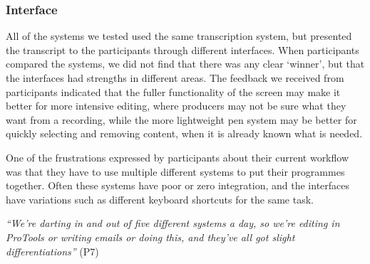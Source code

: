 



\subsubsection{Interface}

All of the systems we tested used the same transcription system, but presented the transcript to the participants
through different interfaces. When participants compared the systems, we did not find that there was any clear
`winner', but that the interfaces had strengths in different areas. The feedback we received from participants
indicated that the fuller functionality of the screen may make it better for more intensive editing, where producers
may not be sure what they want from a recording, while the more lightweight pen system may be better for quickly
selecting and removing content, when it is already known what is needed.

One of the frustrations expressed by participants about their current workflow was that they have to use multiple
different systems to put their programmes together. Often these systems have poor or zero integration, and the
interfaces have variations such as different keyboard shortcuts for the same task.

\textit{``We're darting in and out of five different systems a day, so we're editing in ProTools or writing emails or
doing this, and they've all got slight differentiations''} (P7)

